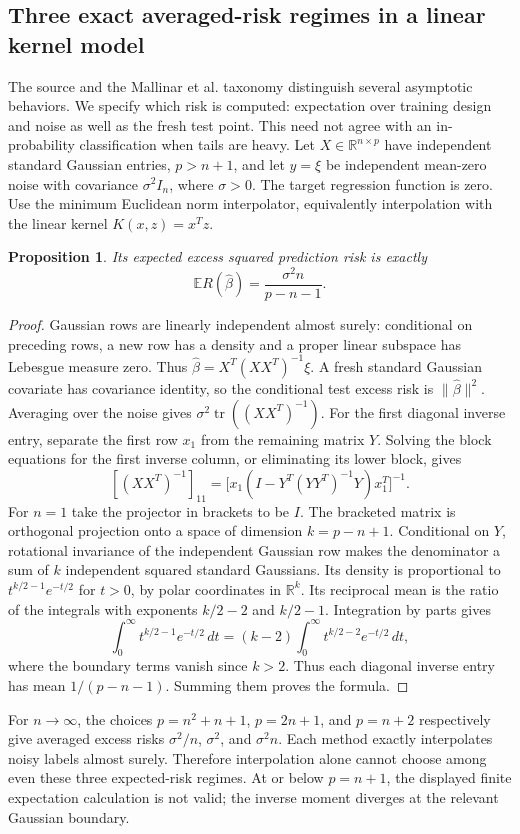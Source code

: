 \documentclass[11pt]{article}
\newtheorem{proposition}{Proposition}
\begin{document}
\subsection{Three exact averaged-risk regimes in a linear kernel model}
The source and the Mallinar et al. taxonomy distinguish several asymptotic behaviors. We specify which risk is computed: expectation over training design and noise as well as the fresh test point. This need not agree with an in-probability classification when tails are heavy. Let $X\in\mathbb R^{n\times p}$ have independent standard Gaussian entries, $p>n+1$, and let $y=\xi$ be independent mean-zero noise with covariance $\sigma^2I_n$, where $\sigma>0$. The target regression function is zero. Use the minimum Euclidean norm interpolator, equivalently interpolation with the linear kernel $K(x,z)=x^Tz$.
\begin{proposition}
Its expected excess squared prediction risk is exactly
\[
\mathbb E R(\widehat\beta)=\frac{\sigma^2 n}{p-n-1}.
\]
\end{proposition}
\begin{proof}
Gaussian rows are linearly independent almost surely: conditional on preceding rows, a new row has a density and a proper linear subspace has Lebesgue measure zero. Thus $\widehat\beta=X^T(XX^T)^{-1}\xi$. A fresh standard Gaussian covariate has covariance identity, so the conditional test excess risk is $\|\widehat\beta\|^2$. Averaging over the noise gives $\sigma^2\operatorname{tr}((XX^T)^{-1})$.
For the first diagonal inverse entry, separate the first row $x_1$ from the remaining matrix $Y$. Solving the block equations for the first inverse column, or eliminating its lower block, gives
\[
[(XX^T)^{-1}]_{11}=
\big[x_1(I-Y^T(YY^T)^{-1}Y)x_1^T\big]^{-1}.
\]
For $n=1$ take the projector in brackets to be $I$. The bracketed matrix is orthogonal projection onto a space of dimension $k=p-n+1$. Conditional on $Y$, rotational invariance of the independent Gaussian row makes the denominator a sum of $k$ independent squared standard Gaussians. Its density is proportional to $t^{k/2-1}e^{-t/2}$ for $t>0$, by polar coordinates in $\mathbb R^k$. Its reciprocal mean is the ratio of the integrals with exponents $k/2-2$ and $k/2-1$. Integration by parts gives
\[
\int_0^\infty t^{k/2-1}e^{-t/2}\,dt
=(k-2)\int_0^\infty t^{k/2-2}e^{-t/2}\,dt,
\]
where the boundary terms vanish since $k>2$. Thus each diagonal inverse entry has mean $1/(p-n-1)$. Summing them proves the formula.
\end{proof}
For $n\to\infty$, the choices $p=n^2+n+1$, $p=2n+1$, and $p=n+2$ respectively give averaged excess risks $\sigma^2/n$, $\sigma^2$, and $\sigma^2 n$. Each method exactly interpolates noisy labels almost surely. Therefore interpolation alone cannot choose among even these three expected-risk regimes. At or below $p=n+1$, the displayed finite expectation calculation is not valid; the inverse moment diverges at the relevant Gaussian boundary.
\end{document}
